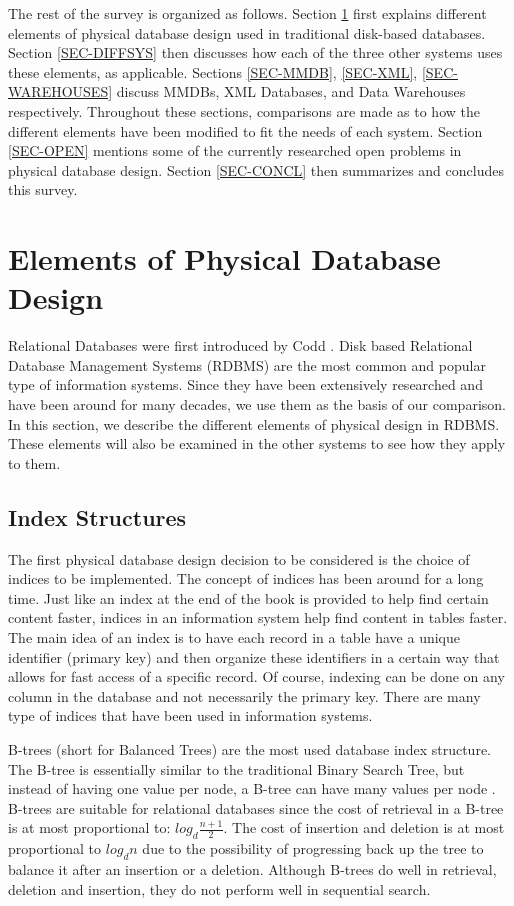 \documentclass[12pt,a4paper]{article}
\begin{document}
The rest of the survey is organized as follows. Section \ref{SEC-ELEMENTS} first explains different elements of physical database design used in traditional
disk-based databases. Section \ref{SEC-DIFFSYS} then discusses how each of the three other systems uses these elements, as applicable. Sections \ref{SEC-MMDB},
\ref{SEC-XML}, \ref{SEC-WAREHOUSES} discuss MMDBs, XML Databases, and Data Warehouses respectively. Throughout these sections, comparisons are
made as to how the different elements have been modified to fit the needs of each system. Section \ref{SEC-OPEN} mentions some of the currently researched open
problems in physical database design. Section \ref{SEC-CONCL} then summarizes and concludes this survey.

\section{Elements of Physical Database Design}
\label{SEC-ELEMENTS}

Relational Databases were first introduced by Codd \cite{codd1970relational}. Disk based Relational Database Management Systems (RDBMS) are the most common and
popular type of information systems. Since they have been extensively researched and have been around for many decades, we use them as the basis of our
comparison. In this section, we describe the different elements of physical design in RDBMS. These elements will also be examined in the other systems to see
how they apply to them.

\subsection{Index Structures}

The first physical database design decision to be considered is the choice of indices to be implemented. The concept of indices has been around for a long time.
Just like an index at the end of the book is provided to help find certain content faster, indices in an information system help find content in tables faster.
The main idea of an index is to have each record in a table have a unique identifier (primary key) and then organize these identifiers in a certain way that
allows for fast access of a specific record. Of course, indexing can be done on any column in the database and not necessarily the primary key. There are many
type of indices that have been used in information systems.

B-trees (short for Balanced Trees) are the most used database index structure.  The B-tree is essentially similar to the traditional Binary Search Tree, but
instead of having one value per node, a B-tree can have many values per node \cite{comer1979ubiquitous}. B-trees are suitable for relational databases since the
cost of retrieval in a B-tree is at most proportional to: $log_{d}\frac{n+1}{2}$. The cost of insertion and deletion is at most proportional to $log_{d}n$ due
to the possibility of progressing back up the tree to balance it after an insertion or a deletion. Although B-trees do well in retrieval, deletion and
insertion, they do not perform well in sequential search. 
\end{document}
